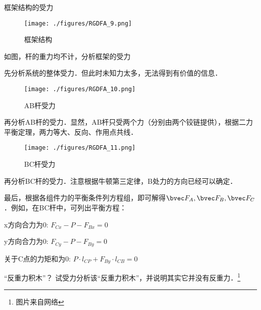 \begin{example}{框架结构的受力}
\begin{figure}[ht]
\centering
\texttt{[image: ./figures/RGDFA\_9.png]}
\caption{框架结构} \label{RGDFA_fig9}
\end{figure}
如图，杆的重力均不计，分析框架的受力

先分析系统的整体受力．但此时未知力太多，无法得到有价值的信息．

\begin{figure}[ht]
\centering
\texttt{[image: ./figures/RGDFA\_10.png]}
\caption{AB杆受力} \label{RGDFA_fig10}
\end{figure}

再分析AB杆的受力．显然，AB杆只受两个力（分别由两个铰链提供），根据二力平衡定理，两力等大、反向、作用点共线．

\begin{figure}[ht]
\centering
\texttt{[image: ./figures/RGDFA\_11.png]}
\caption{BC杆受力} \label{RGDFA_fig11}
\end{figure}
再分析BC杆的受力．注意根据牛顿第三定律，B处力的方向已经可以确定．

最后，根据各组件力的平衡条件列方程组，即可解得$\bvec F_A, \bvec F_B, \bvec F_C$．例如，在BC杆中，可列出平衡方程：

x方向合力为0: $F_{Cx}-P-F_{Bx}=0$

y方向合力为0: $F_{Cy}-P-F_{By}=0$

关于C点的力矩和为0: $P \cdot l_{CP} + F_{By} \cdot l_{CB} = 0$
\end{example}

\begin{exercise}{“反重力积木”？}
试受力分析该“反重力积木”，并说明其实它并没有反重力．\footnote{图片来自网络}
\end{exercise}

